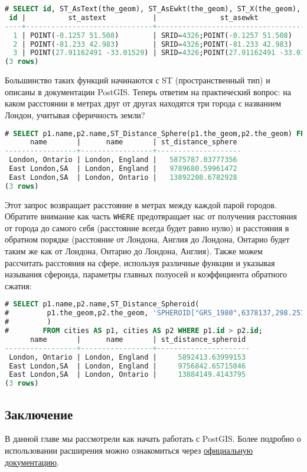 \begin{lstlisting}[language=SQL,label=lst:postgisselectcities2,caption=SELECT cities]
# SELECT id, ST_AsText(the_geom), ST_AsEwkt(the_geom), ST_X(the_geom), ST_Y(the_geom) FROM cities;
 id |          st_astext           |               st_asewkt                |    st_x     |   st_y
----+------------------------------+----------------------------------------+-------------+-----------
  1 | POINT(-0.1257 51.508)        | SRID=4326;POINT(-0.1257 51.508)        |     -0.1257 |    51.508
  2 | POINT(-81.233 42.983)        | SRID=4326;POINT(-81.233 42.983)        |     -81.233 |    42.983
  3 | POINT(27.91162491 -33.01529) | SRID=4326;POINT(27.91162491 -33.01529) | 27.91162491 | -33.01529
(3 rows)
\end{lstlisting}

Большинство таких функций начинаются с ST (пространственный тип) и описаны в документации PostGIS. Теперь ответим на практический вопрос: на каком расстоянии в метрах друг от другах находятся три города с названием Лондон, учитывая сферичность земли?

\begin{lstlisting}[language=SQL,label=lst:postgisselectcities3,caption=Расстояние до Лондона]
# SELECT p1.name,p2.name,ST_Distance_Sphere(p1.the_geom,p2.the_geom) FROM cities AS p1, cities AS p2 WHERE p1.id > p2.id;
      name       |      name       | st_distance_sphere
-----------------+-----------------+--------------------
 London, Ontario | London, England |   5875787.03777356
 East London,SA  | London, England |   9789680.59961472
 East London,SA  | London, Ontario |   13892208.6782928
(3 rows)
\end{lstlisting}

Этот запрос возвращает расстояние в метрах между каждой парой городов. Обратите внимание как часть \lstinline!WHERE! предотвращает нас от получения расстояния от города до самого себя (расстояние всегда будет равно нулю) и расстояния в обратном порядке (расстояние от Лондона, Англия до Лондона, Онтарио будет таким же как от Лондона, Онтарио до Лондона, Англия). Также можем рассчитать расстояния на сфере, используя различные функции и указывая называния сфероида, параметры главных полуосей и коэффициента обратного сжатия:

\begin{lstlisting}[language=SQL,label=lst:postgisselectcities4,caption=Расстояние до Лондона]
# SELECT p1.name,p2.name,ST_Distance_Spheroid(
#         p1.the_geom,p2.the_geom, 'SPHEROID["GRS_1980",6378137,298.257222]'
#         )
#        FROM cities AS p1, cities AS p2 WHERE p1.id > p2.id;
      name       |      name       | st_distance_spheroid
-----------------+-----------------+----------------------
 London, Ontario | London, England |     5892413.63999153
 East London,SA  | London, England |     9756842.65715046
 East London,SA  | London, Ontario |     13884149.4143795
(3 rows)
\end{lstlisting}


\subsection{Заключение}

В данной главе мы рассмотрели как начать работать с PostGIS. Более подробно о использовании расширения можно ознакомиться через \href{http://postgis.net/documentation/}{официальную документацию}.
